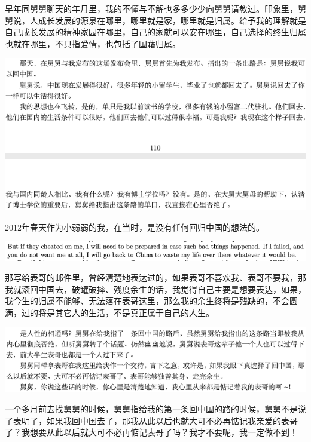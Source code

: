 \documentclass[9pt, b5paper]{article}
\begin{document}
早年同舅舅聊天的年月里，我的不懂与不解也多多少少向舅舅请教过。印象里，舅舅说，人成长发展的源泉在哪里，哪里就是家，哪里就是归属。给予我的理解就是自己成长发展的精神家园在哪里，自己的家就可以安在哪里，自己选择的终生归属也就在哪里，不只指爱情，也包括了国藉归属。

\begin{center}
\includegraphics[width=.9\linewidth]{./pic/backups_plans_20210415_175457.png}
\end{center}

2012年春天作为小弱弱的我，在当时，是没有任何回归中国的想法的。 

\begin{center}
\includegraphics[width=.9\linewidth]{./pic/backups_plans_20210415_173600.png}
\end{center}

那写给表哥的邮件里，曾经清楚地表达过的，如果表哥不喜欢我、表哥不要我，那我就滚回中国去，破罐破摔、残度余生的话，我觉得自己主要是想要表达，如果，我今生的归属不能够、无法落在表哥这里，那么我的余生终将是残缺的，不会圆满，过的将是其它人的生活，不是真正属于自己的人生。 

\begin{center}
\includegraphics[width=.9\linewidth]{./pic/backups_plans_20210415_175626.png}
\end{center}

一个多月前去找舅舅的时候，舅舅指给我的第一条回中国的路的时候，舅舅不是说了表明了，如果我回中国去了，那我从此以后也就大可不必再惦记我亲爱的表哥了？我想要从此以后就大可不必再惦记表哥了吗？我才不要呢，我一定做不到！
\end{document}

